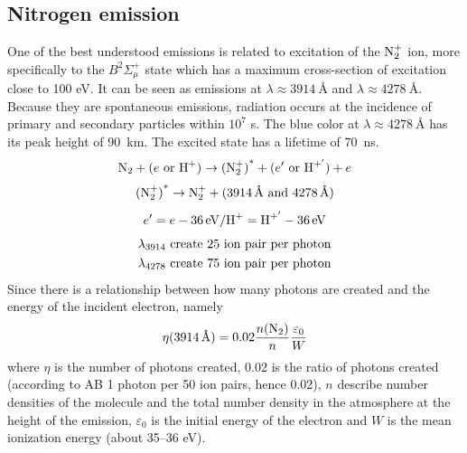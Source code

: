 \subsection{Nitrogen emission}
One of the best understood emissions is related to excitation of the \(\textnormal{N}_2^+\) ion, more specifically to the \(B^2\Sigma_\mu^+\) state which has a maximum cross-section of excitation close to 100 eV. It can be seen as emissions at \(\lambda\approx\SI{3914}{\angstrom}\) and \(\lambda\approx\SI{4278}{\angstrom}\). Because they are spontaneous emissions, radiation occurs at the incidence of primary and secondary particles within \(10^7\) s. The {\color{blue}blue} color at \(\lambda\approx\SI{4278}{\angstrom}\) has its peak height of \SI{90}{\kilo\metre}. The excited state has a lifetime of \SI{70}{\nano\second}.
\begin{equation*}
    \textnormal{N}_2+(e\textnormal{ or }\textnormal{H}^+)\rightarrow{(\textnormal{N}_2^+)}^*+(e'\textnormal{ or }\textnormal{H}^{+'})+e
\end{equation*}
\begin{equation*}
    {(\textnormal{N}_2^+)}^*\rightarrow \textnormal{N}_2^++(\SI{3914}{\angstrom}\textnormal{ and }\SI{4278}{\angstrom})
\end{equation*}
\begin{equation*}
    e'=e-\SI{36}{\electronvolt}/\textnormal{H}^{+}=\textnormal{H}^{+'} -\SI{36}{\electronvolt}
\end{equation*}
\begin{align*}
    \lambda_{3914} \textnormal{ create }25\textnormal{ ion pair per photon}\\
    \lambda_{4278} \textnormal{ create }75\textnormal{ ion pair per photon}
\end{align*}
Since there is a relationship between how many photons are created and the energy of the incident electron, namely
\begin{equation}\label{eq:L4_number_of_photons_per_ion}
    \eta(\SI{3914}{\angstrom})=0.02\frac{n(\textnormal{N}_2)}{n}\frac{\varepsilon_0}{W}
\end{equation}
where \(\eta \) is the number of photons created, 0.02 is the ratio of photons created (according to AB 1 photon per 50 ion pairs, hence 0.02), \(n\) describe number densities of the molecule and the total number density in the atmosphere at the height of the emission, \(\varepsilon_0\) is the initial energy of the electron and \(W\) is the mean ionization energy (about 35--36 eV).

